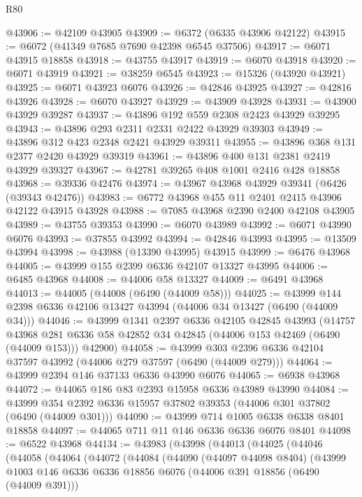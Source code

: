 \begin{lexlean}{R80}
\begin{coremodule}
@43906 := @42109 @43905
@43909 := @6372 (@6335 @43906 @42122)
@43915 := @6072 (@41349 @7685 @7690 @42398 @6545 @37506)
@43917 := @6071 @43915 @18858
@43918 := @43755 @43917
@43919 := @6070 @43918
@43920 := @6071 @43919
@43921 := @38259 @6545
@43923 := @15326 (@43920 @43921)
@43925 := @6071 @43923 @6076
@43926 := @42846 @43925
@43927 := @42816 @43926
@43928 := @6070 @43927
@43929 := @43909 @43928
@43931 := @43900 @43929 @39287
@43937 := @43896 @192 @559 @2308 @2423 @43929 @39295
@43943 := @43896 @293 @2311 @2331 @2422 @43929 @39303
@43949 := @43896 @312 @423 @2348 @2421 @43929 @39311
@43955 := @43896 @368 @131 @2377 @2420 @43929 @39319
@43961 := @43896 @400 @131 @2381 @2419 @43929 @39327
@43967 := @42781 @39265 @408 @1001 @2416 @428 @18858
@43968 := @39336 @42476
@43974 := @43967 @43968 @43929 @39341 (@6426 (@39343 @42476))
@43983 := @6772 @43968 @455 @11 @2401 @2415 @43906 @42122 @43915 @43928
@43988 := @7085 @43968 @2390 @2400 @42108 @43905
@43989 := @43755 @39353
@43990 := @6070 @43989
@43992 := @6071 @43990 @6076
@43993 := @37855 @43992
@43994 := @42846 @43993
@43995 := @13509 @43994
@43998 := @43988 (@13390 @43995) @43915
@43999 := @6476 @43968
@44005 := @43999 @155 @2399 @6336 @42107 @13327 @43995
@44006 := @6485 @43968
@44008 := @44006 @58 @13327
@44009 := @6491 @43968
@44013 := @44005 (@44008 (@6490 (@44009 @58)))
@44025 := @43999 @144 @2398 @6336 @42106 @13427 @43994 (@44006 @34 @13427 (@6490 (@44009 @34)))
@44046 := @43999
    @1341
    @2397
    @6336
    @42105
    @42845
    @43993
    (@14757
      @43968
      @281
      @6336
      @58
      @42852
      @34
      @42845
      (@44006 @153 @42469 (@6490 (@44009 @153)))
      @42900)
@44058 := @43999 @303 @2396 @6336 @42104 @37597 @43992 (@44006 @279 @37597 (@6490 (@44009 @279)))
@44064 := @43999 @2394 @146 @37133 @6336 @43990 @6076
@44065 := @6938 @43968
@44072 := @44065 @186 @83 @2393 @15958 @6336 @43989 @43990
@44084 := @43999 @354 @2392 @6336 @15957 @37802 @39353 (@44006 @301 @37802 (@6490 (@44009 @301)))
@44090 := @43999 @714 @1005 @6338 @6338 @8401 @18858
@44097 := @44065 @711 @11 @146 @6336 @6336 @6076 @8401
@44098 := @6522 @43968
@44134 := @43983
    (@43998
      (@44013
        (@44025
          (@44046
            (@44058
              (@44064
                (@44072
                  (@44084
                    (@44090
                      (@44097 @44098 @8404)
                      (@43999
                        @1003
                        @146
                        @6336
                        @6336
                        @18856
                        @6076
                        (@44006 @391 @18856 (@6490 (@44009 @391)))

\end{coremodule}
\end{lexlean}

